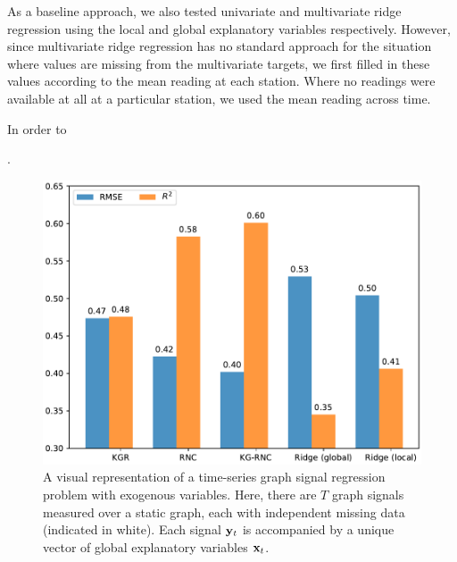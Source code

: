As a baseline approach, we also tested univariate and multivariate ridge regression using the local and global explanatory variables respectively. However, since multivariate ridge regression has no standard approach for the situation where values are missing from the multivariate targets, we first filled in these values according to the mean reading at each station. Where no readings were available at all at a particular station, we used the mean reading across time. 

In order to 

\cite{Cleland2020}. 

\begin{figure}[ht]
    \centering
    \includegraphics[width=0.85\linewidth]{Figures/regression_results.pdf}
    \caption[Graph signal regression with exogenous variables]{A visual representation of a time-series graph signal regression problem with exogenous variables. Here, there are $T$ graph signals measured over a static graph, each with independent missing data (indicated in white). Each signal $\mathbf{y}_t$ is accompanied by a unique vector of global explanatory variables $\mathbf{x}_t$. }
    \label{fig:regression_results}
\end{figure}